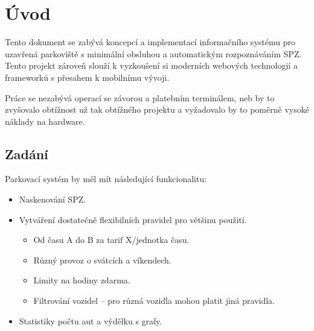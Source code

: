 \chapter{Úvod} \label{uvod}

\noindent
Tento dokument se zabývá koncepcí a implementací informačního systému pro uzavřená
parkoviště s minimální obsluhou a automatickým rozpoznáváním SPZ.
Tento projekt zároveň slouží k vyzkoušení si moderních webových technologií
a frameworků s přesahem k mobilnímu vývoji.

Práce se nezabývá operací se závorou a platebním terminálem, neb by to zvyšovalo
obtížnost už tak obtížného projektu a vyžadovalo by to poměrně vysoké
náklady na hardware.

\section*{Zadání}

Parkovací systém by měl mít následující funkcionalitu:

\begin{itemize}
  \setlength\itemsep{0.05em}
  \item Naskenování SPZ.
  \item Vytváření dostatečně flexibilních pravidel pro většinu použití.
  \begin{itemize}
    \setlength\itemsep{0.05em}
      \item Od času A do B za tarif X/jednotka času.
      \item Různý provoz o svátcích a víkendech. \label{missing1}
      \item Limity na hodiny zdarma.
      \item Filtrování vozidel -- pro různá vozidla mohou platit jiná pravidla.
    \end{itemize}
  \item Statistiky počtu aut a výdělku s grafy.
\end{itemize}

